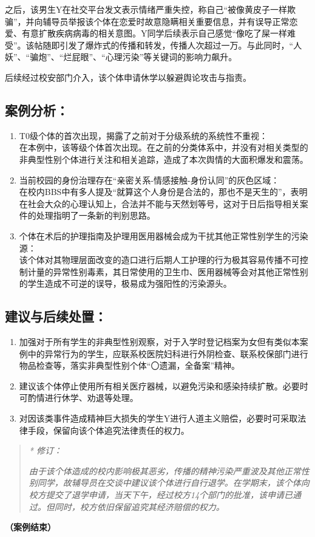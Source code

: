 \documentclass[]{ctexrep}
\begin{document}
	之后，该男生Y在社交平台发文表示情绪严重失控，称自己“被像黄皮子一样欺骗”，并向辅导员举报该个体在恋爱时故意隐瞒相关重要信息，并有误导正常恋爱、有意扩散疾病病毒的相关意图。Y同学后续表示自己感觉“像吃了屎一样难受”。该帖随即引发了爆炸式的传播和转发，传播人次超过一万。与此同时，“人妖”、“骗炮”、“烂屁眼”、“心理污染”等关键词的影响力飙升。
	
	后续经过校安部门介入，该个体申请休学以躲避舆论攻击与指责。
	\subsection{案例分析：}
	\begin{enumerate}
		\item T0级个体的首次出现，揭露了之前对于分级系统的系统性不重视：\\
		在本例中，该等级个体首次出现。在之前的分类体系中，并没有对相关类型的非典型性别个体进行关注和相关追踪，造成了本次舆情的大面积爆发和震荡。
		
		\item 当前校园的身份治理存在“亲密关系-情感接触-身份认同”的灰色区域：\\
		在校内BBS中有多人提及“就算这个人身份是合法的，那也不是天生的”，表明在社会大众的心理认知上，合法并不能与天然划等号，这对于日后指导相关案件的处理指明了一条新的判别思路。
		
		\item 个体在术后的护理指南及护理用医用器械会成为干扰其他正常性别学生的污染源：\\
		该个体对其物理层面改变的造口进行后期人工护理的行为极其容易传播不可控制计量的异常性别毒素，其日常使用的卫生巾、医用器械等会对其他正常性别的学生造成不可逆的误导，极易成为强阳性的污染源头。
	\end{enumerate}
	\subsection{建议与后续处置：}
	\begin{enumerate}
		\item 加强对于所有学生的非典型性别观察，对于入学时登记档案为女但有类似本案例中的异常行为的学生，应联系校医院妇科进行外阴检查、联系校保部门进行物品检查等，落实非典型性别个体“〇遗漏，全备案”精神。
		
		\item 建议该个体停止使用所有相关医疗器械，以避免污染和感染持续扩散。必要时可酌情进行休学、劝退等处理。
		
		\item 对因该类事件造成精神巨大损失的学生Y进行人道主义赔偿，必要时可采取法律手段，保留向该个体追究法律责任的权力。
	\end{enumerate}
	\begin{quotation}
		\textit{\hspace{-4em} * 修订：}
		
		\textit{由于该个体造成的校内影响极其恶劣，传播的精神污染严重波及其他正常性别同学，故辅导员在交谈中建议该个体进行自行退学。在学期末，该个体向校方提交了退学申请，当天下午，经过校方14个部门的批准，该申请已通过。但同时，校方依旧保留追究其经济赔偿的权力。}
	\end{quotation}
	\begin{flushright}
	\textbf{（案例结束）}
	\end{flushright}
	
\end{document}
